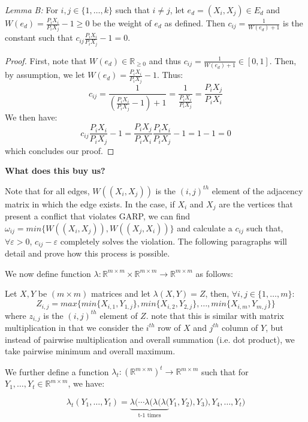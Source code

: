 \documentclass{article} %
\begin{document}
\bigskip

\textit{Lemma B:} For $i,j\in\{1,\ldots,k\}$ such that $i\not=j$, let $e_d=(X_i,X_j)\in E_d$ and $W(e_d)=\frac{P_iX_i}{P_iX_j}-1\geq0$ be the weight of $e_d$ as defined. Then $c_{ij}=\frac{1}{W(e_d)+1}$ is the constant such that $c_{ij}\frac{P_iX_i}{P_iX_j}-1=0$.

\begin{proof}
First, note that $W(e_d)\in \mathbb{R}_{\geq0}$ and thus $c_{ij}=\frac{1}{W(e_d)+1}\in[0,1]$. Then, by assumption, we let $W(e_d)=\frac{P_iX_i}{P_iX_j}-1$. Thus: $$c_{ij}=\frac{1}{(\frac{P_iX_i}{P_iX_j}-1)+1}=\frac{1}{\frac{P_iX_i}{P_iX_j}}=\frac{P_iX_j}{P_iX_i}$$ 
We then have: $$c_{ij}\frac{P_iX_i}{P_iX_j}-1=\frac{P_iX_j}{P_iX_i}\frac{P_iX_i}{P_iX_j}-1=1-1=0$$
which concludes our proof.
\end{proof}

\textbf{What does this buy us?}

Note that for all edges, $W((X_i, X_j))$ is the $(i,j)^{th}$ element of the adjacency matrix in which the edge exists. In the case, if $X_i$ and $X_j$ are the vertices that present a conflict that violates GARP, we can find $\omega_{ij}=min\{W((X_i, X_j)), W((X_j, X_i))\}$ and calculate a $c_{ij}$ such that, $\forall\varepsilon>0$, $c_{ij}-\varepsilon$ completely solves the violation. The following paragraphs will detail and prove how this process is possible.
\bigskip

We now define function $\lambda:\mathbb{R}^{m\times m} \times \mathbb{R}^{m\times m} \to \mathbb{R}^{m\times m}$ as follows:

Let $X,Y$ be $(m\times m)$ matrices and let $\lambda(X,Y)=Z$, then, $\forall i,j\in\{1,\ldots,m\}$:
$$Z_{i,j}=max\{min\{X_{i,1}, Y_{1,j}\}, min\{X_{i,2}, Y_{2,j}\}, \ldots, min\{X_{i,m}, Y_{m,j}\}\}$$
where $z_{i,j}$ is the $(i,j)^{th}$ element of $Z$. note that this is similar with matrix multiplication in that we consider the $i^{th}$ row of $X$ and $j^{th}$ column of $Y$, but instead of pairwise multiplication and overall summation (i.e. dot product), we take pairwise minimum and overall maximum. 
\bigskip

We further define a function $\lambda_t:(\mathbb{R}^{m\times m})^t\to\mathbb{R}^{m\times m}$ such that for $Y_1,\ldots,Y_t\in \mathbb{R}^{m\times m}$, we have:



\[
  \lambda_t(Y_1,\ldots, Y_t) =
    \underbrace{\lambda(\cdots\lambda(\lambda(\lambda(}_\text{t-1 times}
    Y_1,Y_2),Y_3),Y_4,\ldots, Y_t)
\]
\end{document}
